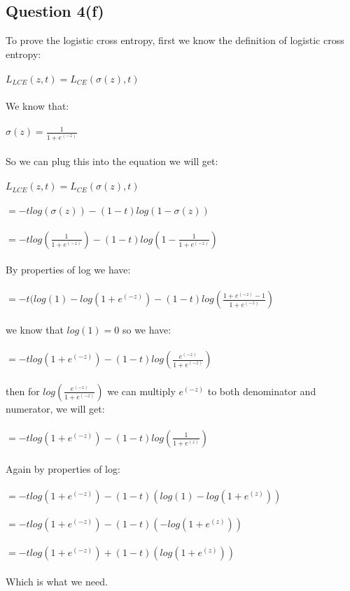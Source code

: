 \documentclass{article}
\begin{document}
        \subsection{Question 4(f)} 
        To prove the logistic cross entropy, first we know the definition of logistic cross entropy:\\\\
        $L_{LCE}(z,t) = L_{CE}(\sigma(z),t)$\\\\
        We know that:\\\\
        $\sigma(z) = \frac{1}{1+e^{(-z)}}$\\\\
        So we can plug this into the equation we will get:\\\\
        $L_{LCE}(z,t) = L_{CE}(\sigma(z),t)$\\\\
        $=-tlog(\sigma(z)) - (1-t)log(1-\sigma(z))$\\\\
        $=-tlog(\frac{1}{1+e^{(-z)}}) - (1-t)log(1-\frac{1}{1+e^{(-z)}})$\\\\
        By properties of log we have:\\\\
        $=-t(log(1)-log(1+e^{(-z)}) - (1-t)log(\frac{1+e^{(-z)}-1}{1+e^{(-z)}})$\\\\
        we know that $log(1) = 0$ so we have:\\\\
        $=-tlog(1+e^{(-z)}) - (1-t)log(\frac{e^{(-z)}}{1+e^{(-z)}})$\\\\
        then for $log(\frac{e^{(-z)}}{1+e^{(-z)}})$ we can multiply $e^{(-z)}$ to both denominator and numerator, we will get:\\\\
        $=-tlog(1+e^{(-z)}) - (1-t)log(\frac{1}{1+e^{(z)}})$\\\\
        Again by properties of log:\\\\
        $=-tlog(1+e^{(-z)}) - (1-t)(log(1)-log(1+e^{(z)}))$\\\\
        $=-tlog(1+e^{(-z)}) - (1-t)(-log(1+e^{(z)}))$\\\\
        $=-tlog(1+e^{(-z)}) + (1-t)(log(1+e^{(z)}))$\\\\
        Which is what we need.\\\
        
\end{document}
